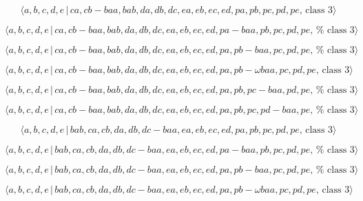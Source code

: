 \documentclass[10pt]{article}
\begin{document}
\begin{equation}
\langle a,b,c,d,e\,|\,ca,cb-baa,bab,da,db,dc,ea,eb,ec,ed,pa,pb,pc,pd,pe,\,%
\text{class }3\rangle  \tag{7.4744}
\end{equation}

\begin{equation}
\langle
a,b,c,d,e\,|\,ca,cb-baa,bab,da,db,dc,ea,eb,ec,ed,pa-baa,pb,pc,pd,pe,\,\text{%
class }3\rangle  \tag{7.4745}
\end{equation}

\begin{equation}
\langle
a,b,c,d,e\,|\,ca,cb-baa,bab,da,db,dc,ea,eb,ec,ed,pa,pb-baa,pc,pd,pe,\,\text{%
class }3\rangle  \tag{7.4746}
\end{equation}

\begin{equation}
\langle a,b,c,d,e\,|\,ca,cb-baa,bab,da,db,dc,ea,eb,ec,ed,pa,pb-\omega
baa,pc,pd,pe,\,\text{class }3\rangle  \tag{7.4747}
\end{equation}

\begin{equation}
\langle
a,b,c,d,e\,|\,ca,cb-baa,bab,da,db,dc,ea,eb,ec,ed,pa,pb,pc-baa,pd,pe,\,\text{%
class }3\rangle  \tag{7.4748}
\end{equation}

\begin{equation}
\langle
a,b,c,d,e\,|\,ca,cb-baa,bab,da,db,dc,ea,eb,ec,ed,pa,pb,pc,pd-baa,pe,\,\text{%
class }3\rangle  \tag{7.4749}
\end{equation}

\begin{equation}
\langle a,b,c,d,e\,|\,bab,ca,cb,da,db,dc-baa,ea,eb,ec,ed,pa,pb,pc,pd,pe,\,%
\text{class }3\rangle  \tag{7.4750}
\end{equation}

\begin{equation}
\langle
a,b,c,d,e\,|\,bab,ca,cb,da,db,dc-baa,ea,eb,ec,ed,pa-baa,pb,pc,pd,pe,\,\text{%
class }3\rangle  \tag{7.4751}
\end{equation}

\begin{equation}
\langle
a,b,c,d,e\,|\,bab,ca,cb,da,db,dc-baa,ea,eb,ec,ed,pa,pb-baa,pc,pd,pe,\,\text{%
class }3\rangle  \tag{7.4752}
\end{equation}

\begin{equation}
\langle a,b,c,d,e\,|\,bab,ca,cb,da,db,dc-baa,ea,eb,ec,ed,pa,pb-\omega
baa,pc,pd,pe,\,\text{class }3\rangle  \tag{7.4753}
\end{equation}
\end{document}
